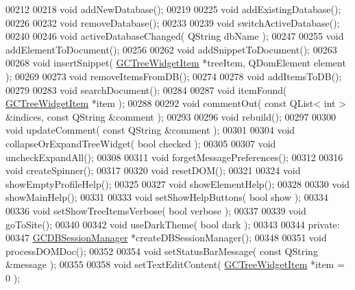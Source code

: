\begin{DoxyCode}
00212 
00218   \textcolor{keywordtype}{void} addNewDatabase();
00219 
00225   \textcolor{keywordtype}{void} addExistingDatabase();
00226 
00232   \textcolor{keywordtype}{void} removeDatabase();
00233 
00239   \textcolor{keywordtype}{void} switchActiveDatabase();
00240 
00246   \textcolor{keywordtype}{void} activeDatabaseChanged( QString dbName );
00247 
00255   \textcolor{keywordtype}{void} addElementToDocument();
00256 
00262   \textcolor{keywordtype}{void} addSnippetToDocument();
00263 
00268   \textcolor{keywordtype}{void} insertSnippet( \hyperlink{class_g_c_tree_widget_item}{GCTreeWidgetItem} *treeItem, QDomElement element );
00269 
00273   \textcolor{keywordtype}{void} removeItemsFromDB();
00274 
00278   \textcolor{keywordtype}{void} addItemsToDB();
00279 
00283   \textcolor{keywordtype}{void} searchDocument();
00284 
00287   \textcolor{keywordtype}{void} itemFound( \hyperlink{class_g_c_tree_widget_item}{GCTreeWidgetItem} *item );
00288 
00292   \textcolor{keywordtype}{void} commentOut( \textcolor{keyword}{const} QList< int > &indices, \textcolor{keyword}{const} QString &comment );
00293 
00296   \textcolor{keywordtype}{void} rebuild();
00297 
00300   \textcolor{keywordtype}{void} updateComment( \textcolor{keyword}{const} QString &comment );
00301 
00304   \textcolor{keywordtype}{void} collapseOrExpandTreeWidget( \textcolor{keywordtype}{bool} checked );
00305 
00307   \textcolor{keywordtype}{void} uncheckExpandAll();
00308 
00311   \textcolor{keywordtype}{void} forgetMessagePreferences();
00312 
00316   \textcolor{keywordtype}{void} createSpinner();
00317 
00320   \textcolor{keywordtype}{void} resetDOM();
00321 
00324   \textcolor{keywordtype}{void} showEmptyProfileHelp();
00325 
00327   \textcolor{keywordtype}{void} showElementHelp();
00328 
00330   \textcolor{keywordtype}{void} showMainHelp();
00331 
00333   \textcolor{keywordtype}{void} setShowHelpButtons( \textcolor{keywordtype}{bool} show );
00334 
00336   \textcolor{keywordtype}{void} setShowTreeItemsVerbose( \textcolor{keywordtype}{bool} verbose );
00337 
00339   \textcolor{keywordtype}{void} goToSite();
00340 
00342   \textcolor{keywordtype}{void} useDarkTheme( \textcolor{keywordtype}{bool} dark );
00343   
00344 \textcolor{keyword}{private}:
00347   \hyperlink{class_g_c_d_b_session_manager}{GCDBSessionManager} *createDBSessionManager();
00348 
00351   \textcolor{keywordtype}{void} processDOMDoc();
00352 
00354   \textcolor{keywordtype}{void} setStatusBarMessage( \textcolor{keyword}{const} QString &message );
00355 
00358   \textcolor{keywordtype}{void} setTextEditContent( \hyperlink{class_g_c_tree_widget_item}{GCTreeWidgetItem} *item = 0 );

\end{DoxyCode}
